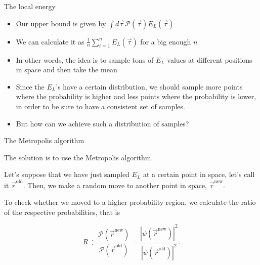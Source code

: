 \documentclass[10pt, compress, usetitleprogressbar, protectframetitle]{beamer}
\begin{document}
\begin{frame}{The local energy}
	
	
	\begin{itemize}[<+->]
		\item Our upper bound is given by $\int d\vec{\tau}\,\mathcal{P}(\vec{\tau})E_L(\vec{\tau})$
		\item We can calculate it as $\frac{1}{n}\sum_{i=1}^{n}E_L(\vec{\tau})$ for a big enough $n$
		\item In other words, the idea is to sample tons of $E_L$ values at different positions in space and then take the mean
		\item Since the $E_L$'s have a certain distribution, we should sample more points where the probability is higher and less points where the probability is lower, in order to be sure to have a consistent set of samples.
		\item \alert{But how can we achieve such a distribution of samples?}
	\end{itemize}
	
\end{frame}

\begin{frame}{The Metropolis algorithm}

	The solution is to use the \alert{Metropolis algorithm}.
	
	Let's suppose that we have just sampled $E_L$ at a certain point in space, let's call it $\vec{r}^{\text{old}}$. Then, we make a \alert{random move} to another point in space, $\vec{r}^{\text{new}}$.
	
	To check whether we moved to a higher probability region, we calculate the ratio of the respective probabilities, that is 
	
	\begin{equation}
		R 
		\doteqdot \frac{\mathcal{P}(\vec{r}^{\text{new}})}{\mathcal{P}(\vec{r}^{\text{old}})}
		= \frac{|\psi(\vec{r}^{\text{new}})|^2}{|\psi(\vec{r}^{\text{old}})|^2}.
	\end{equation}
	
\end{frame}
\end{document}
